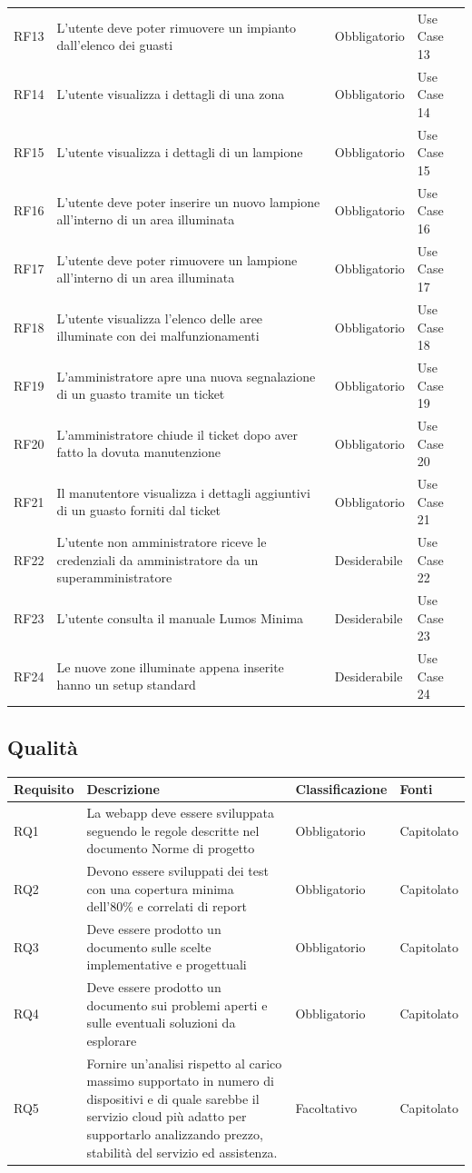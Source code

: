 \documentclass[12pt]{article}
\begin{document}
\begin{longtable}{ |p{1.8cm}|p{5.2cm}|p{3cm}| p{2cm}|}
RF13 & L'utente deve poter rimuovere un impianto dall'elenco dei guasti& Obbligatorio & Use Case 13 \\
RF14 & L'utente visualizza i dettagli di una zona& Obbligatorio & Use Case 14 \\
RF15 & L'utente visualizza i dettagli di un lampione& Obbligatorio & Use Case 15 \\
RF16 & L'utente deve poter inserire un nuovo lampione all'interno di un area illuminata& Obbligatorio & Use Case 16 \\
RF17 & L'utente deve poter rimuovere un lampione all'interno di un area illuminata& Obbligatorio & Use Case 17 \\
RF18 & L'utente visualizza l'elenco delle aree illuminate con dei malfunzionamenti& Obbligatorio & Use Case 18 \\
RF19 & L'amministratore apre una nuova segnalazione di un guasto tramite un ticket & Obbligatorio & Use Case 19\\
RF20 & L'amministratore chiude il ticket dopo aver fatto la dovuta manutenzione & Obbligatorio & Use Case 20\\
RF21 & Il manutentore visualizza i dettagli aggiuntivi di un guasto forniti dal ticket & Obbligatorio & Use Case 21\\
RF22 & L'utente non amministratore riceve le credenziali da amministratore da un superamministratore& Desiderabile & Use Case 22 \\
RF23 & L'utente consulta il manuale Lumos Minima & Desiderabile & Use Case 23\\
RF24 & Le nuove zone illuminate appena inserite hanno un setup standard& Desiderabile& Use Case 24\\
\hline
\end{longtable}
\subsection{Qualità}
\begin{tabular}{ |p{1.8cm}|p{5.2cm}|p{3cm}| p{2cm}| }
\hline
Requisito& Descrizione &Classificazione &Fonti \\
\hline
RQ1 & La webapp deve essere sviluppata seguendo le regole descritte nel documento Norme di progetto & Obbligatorio & Capitolato \\
RQ2 & Devono essere sviluppati dei test con una copertura minima dell'80\% e correlati di report & Obbligatorio & Capitolato\\
RQ3 & Deve essere prodotto un documento sulle scelte implementative e progettuali & Obbligatorio & Capitolato \\
RQ4 & Deve essere prodotto un documento sui problemi aperti e sulle eventuali soluzioni da esplorare & Obbligatorio & Capitolato \\
RQ5 & Fornire un’analisi rispetto al carico massimo supportato in numero di dispositivi e di quale sarebbe il servizio cloud più adatto per supportarlo analizzando prezzo, stabilità del servizio ed assistenza.  &  Facoltativo & Capitolato \\
\hline

\end{tabular}
\end{document}
